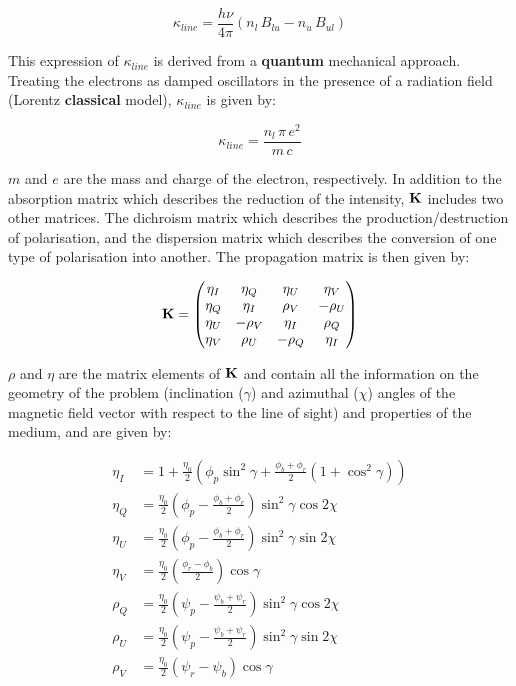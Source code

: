 \documentclass[goettingen, gauss, print]{thesis}
\begin{document}
\begin{equation}
\kappa_{line} = \frac{h\nu}{4\pi} (n_l\,B_{lu} - n_u\,B_{ul})
\end{equation}

This expression of $\kappa_{line}$ is derived from a \textbf{quantum} mechanical approach. Treating the electrons as damped oscillators in the presence of a radiation field (Lorentz \textbf{classical} model), $\kappa_{line}$ is given by:

\begin{equation}
\kappa_{line} = \frac{n_l\,\pi \,e^2}{m\,c}
\end{equation}
 
$m$ and $e$ are the mass and charge of the electron, respectively. In addition to the absorption matrix which describes the reduction of the intensity, $\bold{K}$ includes two other matrices. The dichroism matrix which describes the production/destruction of polarisation, and the dispersion matrix which describes the conversion of one type of polarisation into another. The propagation matrix is then given by:

\begin{equation}
\bold{K} = 
\begin{pmatrix}
\eta_I & \eta_Q & \eta_U & \eta_V \\
\eta_Q & \eta_I & \rho_V & -\rho_U\\
\eta_U & -\rho_V & \eta_I & \rho_Q \\
\eta_V & \rho_U & -\rho_Q & \eta_I \\
\end{pmatrix}
\end{equation}

$\rho$ and $\eta$ are the matrix elements of $\bold{K}$ and contain all the information on the geometry of the problem (inclination ($\gamma$) and azimuthal ($\chi$) angles of the magnetic field vector with respect to the line of sight) and properties of the medium, and are given by:

\begin{align*}
\eta_I &= 1+\frac{\eta_0}{2} \left(\phi_p \sin^2\gamma + \frac{\phi_b+\phi_r}{2}(1+\cos^2 \gamma)\right) \\
\eta_Q &= \frac{\eta_0}{2} \left(\phi_p - \frac{\phi_b + \phi_r}{2}    \right) \sin^2 \gamma \cos 2\chi \\
\eta_U &= \frac{\eta_0}{2} \left(\phi_p - \frac{\phi_b + \phi_r}{2}    \right) \sin^2 \gamma \sin 2\chi \\
\eta_V &= \frac{\eta_0}{2} \left(\frac{\phi_r - \phi_b}{2}    \right) \cos \gamma \\
\rho_Q &=  \frac{\eta_0}{2} \left(\psi_p - \frac{\psi_b + \psi_r}{2}    \right) \sin^2 \gamma \cos 2\chi \\
\rho_U &=  \frac{\eta_0}{2} \left(\psi_p - \frac{\psi_b + \psi_r}{2}    \right) \sin^2 \gamma \sin 2\chi \\
\rho_V &= \frac{\eta_0}{2} \left(\psi_r - \psi_b  \right) \cos \gamma 
\end{align*}
\end{document}

